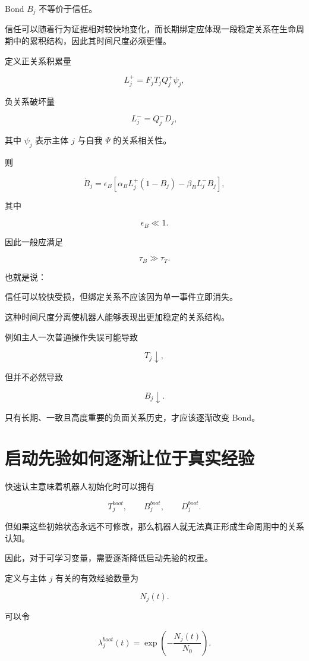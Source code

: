 Bond $B_j$ 不等价于信任。

信任可以随着行为证据相对较快地变化，而长期绑定应体现一段稳定关系在生命周期中的累积结构，因此其时间尺度必须更慢。

定义正关系积累量

\[
L_j^+
=
F_j
T_j
Q_j^+
\psi_j,
\]

负关系破坏量

\[
L_j^-
=
Q_j^-
D_j,
\]

其中 $\psi_j$ 表示主体 $j$ 与自我 $\Psi$ 的关系相关性。

则

\[
\boxed{
\dot B_j
=
\epsilon_B
\left[
\alpha_B
L_j^+
(1-B_j)
-
\beta_B
L_j^-B_j
\right],
}
\]

其中

\[
\epsilon_B\ll1.
\]

因此一般应满足

\[
\tau_B\gg\tau_T.
\]

也就是说：

\begin{statementbox}
信任可以较快受损，但绑定关系不应该因为单一事件立即消失。
\end{statementbox}

这种时间尺度分离使机器人能够表现出更加稳定的关系结构。

例如主人一次普通操作失误可能导致

\[
T_j\downarrow,
\]

但并不必然导致

\[
B_j\downarrow.
\]

只有长期、一致且高度重要的负面关系历史，才应该逐渐改变 Bond。


\section{启动先验如何逐渐让位于真实经验}

快速认主意味着机器人初始化时可以拥有

\[
T_j^{boot},
\qquad
B_j^{boot},
\qquad
D_j^{boot}.
\]

但如果这些初始状态永远不可修改，那么机器人就无法真正形成生命周期中的关系认知。

因此，对于可学习变量，需要逐渐降低启动先验的权重。

定义与主体 $j$ 有关的有效经验数量为

\[
N_j(t).
\]

可以令

\[
\lambda_j^{boot}(t)
=
\exp
\left(
-\frac{N_j(t)}{N_0}
\right).
\]

